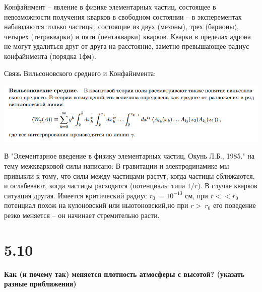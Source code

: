 \documentclass[a4paper,14pt]{article}
\begin{document}
Конфайнмент – явление в физике элементарных частиц, состоящее в невозможности получения кварков в свободном состоянии – в эксперементах наблюдаются только частицы, состоящие из двух (мезоны), трех (барионы), четырех (тетракварки) и пяти (пентакварки) кварков. Кварки в пределах адрона не могут удалиться друг от друга на расстояние, заметно превышающее радиус конфайнмента (порядка 1фм).

Связь Вильсоновского среднего и Конфайнмента:
\begin{center}
\includegraphics[width=1.00\textwidth]{5_8_0}
\end{center}

В "Элементарное введение в физику элементарных частиц, Окунь Л.Б., 1985." на тему межкварковой силы написано:
В гравитации и электродинамике мы привыкли к тому, что силы между частицами растут, когда частицы сближаются, и ослабевают, когда частицы расходятся (потенциалы типа $1/r$). В случае кварков ситуация другая. Имеется критический радиус $r_0~=10^{-13}$ см, при $r<<r_{0}$ потенциал похож на кулоновский или ньютоновский,но при $r>~r_0$ его поведение резко меняется – он начинает стремительно расти.

\section*{5.10}

\begin{center}
	\LARGE{\textbf{Как (и почему так) меняется плотность атмосферы с высотой? (указать разные приближения)}}\\
\end{center}
\end{document}
